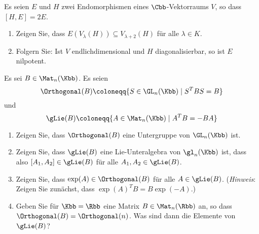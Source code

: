 \begin{question}
  Es seien $E$ und $H$ zwei Endomorphismen eines $\Cbb$-Vektorraums $V$, so dass $[H,E] = 2E$.
  \begin{enumerate}[leftmargin=*]
    \item
      Zeigen Sie, dass $E(V_\lambda(H)) \subseteq V_{\lambda + 2}(H)$ für alle $\lambda \in K$.
    \item
      Folgern Sie: Ist $V$ endlichdimensional und $H$ diagonalisierbar, so ist $E$ nilpotent.
  \end{enumerate}
\end{question}


\begin{question}
  Es sei $B \in \Mat_n(\Kbb)$.
  Es seien
  \[
              \Orthogonal(B)
    \coloneqq \{ S \in \GL_n(\Kbb) \mid S^T B S = B \}
  \]
  und
  \[          \gLie(B)
    \coloneqq \{ A \in \Mat_n(\Kbb) \mid A^T B = - B A \}
  \]
  \begin{enumerate}[leftmargin=*]
    \item
      Zeigen Sie, dass $\Orthogonal(B)$ eine Untergruppe von $\GL_n(\Kbb)$ ist.
    \item
      Zeigen Sie, dass $\gLie(B)$ eine Lie-Unteralgebra von $\gl_n(\Kbb)$ ist, dass also $[A_1, A_2] \in \gLie(B)$ für alle $A_1, A_2 \in \gLie(B)$.
    \item
      Zeigen Sie, dass $\exp(A) \in \Orthogonal(B)$ für alle $A \in \gLie(B)$.
      (\emph{Hinweis}:
       Zeigen Sie zunächst, dass $\exp(A)^T B = B \exp(-A)$.)
    \item
      Geben Sie für $\Kbb = \Rbb$ eine Matrix $B \in \Mat_n(\Rbb)$ an, so dass $\Orthogonal(B) = \Orthogonal(n)$.
      Was sind dann die Elemente von $\gLie(B)$?
  \end{enumerate}
\end{question}


